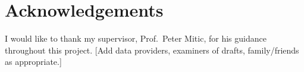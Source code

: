 \chapter*{Acknowledgements}

I would like to thank my supervisor, Prof.\ Peter Mitic, for his guidance
throughout this project. [Add data providers, examiners of drafts,
family/friends as appropriate.]
